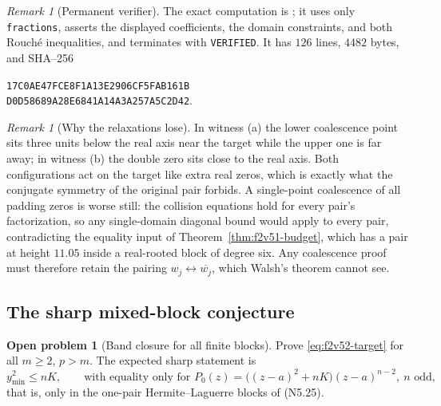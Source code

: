 \documentclass[11pt]{article}
\theoremstyle{definition}
\newtheorem{problem}[theorem]{Open problem}
\theoremstyle{remark}
\newtheorem{remark}[theorem]{Remark}
\begin{document}
\begin{remark}[Permanent verifier]
\label{rem:f2v52-verifier}
The exact computation is
; it uses only
\texttt{fractions}, asserts the displayed coefficients, the domain
constraints, and both Rouch\'{e} inequalities, and terminates with
\texttt{VERIFIED}.  It has \(126\) lines, \(4482\) bytes, and SHA--256
\begin{center}
\texttt{17C0AE47FCE8F1A13E2906CF5FAB161B}\\
\texttt{D0D58689A28E6841A14A3A257A5C2D42}.
\end{center}
\end{remark}

\begin{remark}[Why the relaxations lose]
\label{rem:f2v52-why}
In witness (a) the lower coalescence point sits three units below the
real axis near the target while the upper one is far away; in witness
(b) the double zero sits close to the real axis.  Both configurations
act on the target like extra real zeros, which is exactly what the
conjugate symmetry of the original pair forbids.  A single-point
coalescence of all padding zeros is worse still: the collision
equations hold for every pair's factorization, so any single-domain
diagonal bound would apply to every pair, contradicting the equality
input of Theorem~\ref{thm:f2v51-budget}, which has a pair at height
\(11.05\) inside a real-rooted block of degree six.  Any coalescence
proof must therefore retain the pairing \(w_j\leftrightarrow\overline{w_j}\),
which Walsh's theorem cannot see.
\end{remark}

\subsection{The sharp mixed-block conjecture}

\begin{problem}[Band closure for all finite blocks]
\label{prob:f2v52-band}
Prove \eqref{eq:f2v52-target} for all \(m\ge2\), \(p>m\).  The
expected sharp statement is
\begin{equation}
 y_{\min}^2\le nK,\qquad\text{with equality only for }
 P_0(z)=\bigl((z-a)^2+nK\bigr)(z-a)^{n-2},\ n\text{ odd},
 \label{eq:f2v52-conjecture}
\end{equation}
that is, only in the one-pair Hermite--Laguerre blocks of
\textup{(N5.25)}.
\end{problem}
\end{document}
